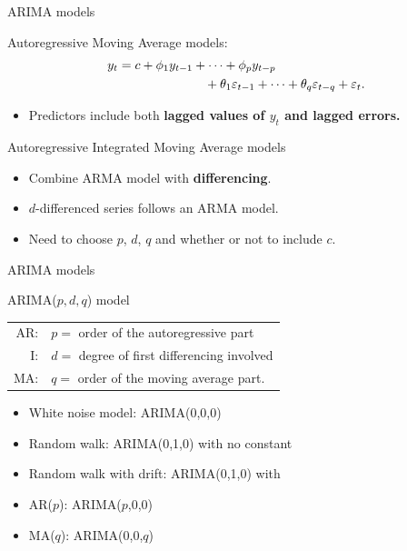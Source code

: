 \documentclass[
  14pt,
  ignorenonframetext,
  aspectratio=169,
]{beamer}
\providecommand{\tightlist}{%
  \setlength{\itemsep}{0pt}\setlength{\parskip}{0pt}}
\begin{document}
\begin{frame}{ARIMA models}
\protect{}\label{arima-models-2}
\begin{block}{Autoregressive Moving Average models:}\vspace*{-0.7cm}
\begin{align*}
  y_{t} &= c + \phi_{1}y_{t - 1} + \cdots + \phi_{p}y_{t - p} \\
        & \hspace*{2.4cm}\text{} + \theta_{1}\varepsilon_{t - 1} + \cdots + \theta_{q}\varepsilon_{t - q} + \varepsilon_{t}.
\end{align*}
\end{block}\pause

\begin{itemize}
\tightlist
\item
  Predictors include both \textbf{lagged values of \(y_t\) and lagged
  errors.} \pause
\end{itemize}

\begin{block}{Autoregressive Integrated Moving Average models}
\protect{}\label{autoregressive-integrated-moving-average-models}
\begin{itemize}
\tightlist
\item
  Combine ARMA model with \textbf{differencing}.
\item
  \(d\)-differenced series follows an ARMA model.
\item
  Need to choose \(p\), \(d\), \(q\) and whether or not to include
  \(c\).
\end{itemize}
\end{block}
\end{frame}

\begin{frame}{ARIMA models}
\protect{}\label{arima-models-3}
\begin{block}{ARIMA($p, d, q$) model}
\begin{tabular}{rl}
AR:& $p =$ order of the autoregressive part\\
I: & $d =$ degree of first differencing involved\\
MA:& $q =$ order of the moving average part.
\end{tabular}
\end{block}

\begin{itemize}
\tightlist
\item
  White noise model: ARIMA(0,0,0)
\item
  Random walk: ARIMA(0,1,0) with no constant
\item
  Random walk with drift: ARIMA(0,1,0) with 
\item
  AR(\(p\)): ARIMA(\(p\),0,0)
\item
  MA(\(q\)): ARIMA(0,0,\(q\))
\end{itemize}
\end{frame}
\end{document}

